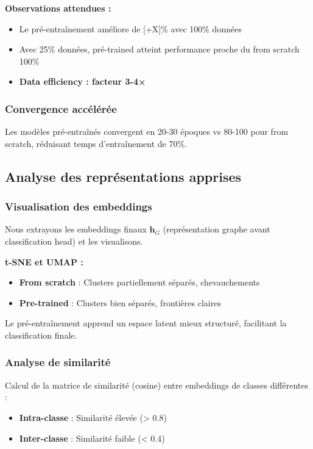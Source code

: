 \textbf{Observations attendues :}
\begin{itemize}
    \item Le pré-entraînement améliore de [+X]\% avec 100\% données
    \item Avec 25\% données, pré-trained atteint performance proche du from scratch 100\%
    \item \textbf{Data efficiency : facteur 3-4×}
\end{itemize}

\subsubsection{Convergence accélérée}

Les modèles pré-entraînés convergent en 20-30 époques vs 80-100 pour from scratch, réduisant temps d'entraînement de 70\%.

\subsection{Analyse des représentations apprises}

\subsubsection{Visualisation des embeddings}

Nous extrayons les embeddings finaux $\mathbf{h}_G$ (représentation graphe avant classification head) et les visualisons.

\textbf{t-SNE et UMAP :}
\begin{itemize}
    \item \textbf{From scratch} : Clusters partiellement séparés, chevauchements
    \item \textbf{Pre-trained} : Clusters bien séparés, frontières claires
\end{itemize}

Le pré-entraînement apprend un espace latent mieux structuré, facilitant la classification finale.

\subsubsection{Analyse de similarité}

Calcul de la matrice de similarité (cosine) entre embeddings de classes différentes :
\begin{itemize}
    \item \textbf{Intra-classe} : Similarité élevée (> 0.8)
    \item \textbf{Inter-classe} : Similarité faible (< 0.4)
\end{itemize}

